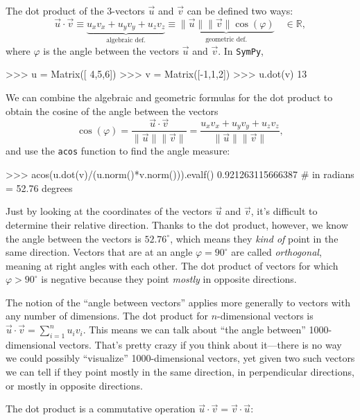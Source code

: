 The dot product of the $3$-vectors $\vec{u}$ and $\vec{v}$ can be defined two ways:
\[
  \vec{u}\cdot\vec{v}
  	\equiv 
	\underbrace{u_xv_x+u_yv_y+u_zv_z}_{\textrm{algebraic def.}} 
	\equiv 
	\underbrace{\|\vec{u}\|\|\vec{v}\|\cos(\varphi)}_{\textrm{geometric def.}} 
	\quad \in \mathbb{R},
\]
where $\varphi$ is the angle between the vectors $\vec{u}$ and $\vec{v}$.
In \texttt{SymPy},

\small
\begin{verbatimtab}
>>> u = Matrix([ 4,5,6])
>>> v = Matrix([-1,1,2])
>>> u.dot(v)
13
\end{verbatimtab}
\normalsize

\noindent
We can combine the algebraic and geometric formulas for the dot product
to obtain the cosine of the angle between the vectors 
\[
    \cos(\varphi)
        = \frac{ \vec{u}\cdot\vec{v} }{  \|\vec{u}\|\|\vec{v}\| }
        = \frac{ u_xv_x+u_yv_y+u_zv_z  }{  \|\vec{u}\|\|\vec{v}\| },
\]
and use the \texttt{acos} function to find the angle measure:

\small
\begin{verbatimtab}
>>> acos(u.dot(v)/(u.norm()*v.norm())).evalf()
0.921263115666387      # in radians  =  52.76 degrees
\end{verbatimtab}
\normalsize

\noindent
Just by looking at the coordinates of the vectors $\vec{u}$ and $\vec{v}$,
it's difficult to determine their relative direction. 
Thanks to the dot product, however,
we know the angle between the vectors is $52.76^\circ$,
which means they \emph{kind of} point in the same direction.
Vectors that are at an angle $\varphi=90^\circ$ are called \emph{orthogonal}, meaning at right angles with each other.
The dot product of vectors for which $\varphi > 90^\circ$ is negative because they point \emph{mostly} in opposite directions.

The notion of the ``angle between vectors'' applies more generally to vectors with any number of dimensions.
The dot product for $n$-dimensional vectors is $\vec{u}\cdot\vec{v}=\sum_{i=1}^n u_iv_i$.
This means we can talk about ``the angle between'' 1000-dimensional vectors.
That's pretty crazy if you think about it---there is no way we could possibly ``visualize'' 1000-dimensional vectors,
yet given two such vectors we can tell if they point mostly in the same direction,
in perpendicular directions, or mostly in opposite directions. 

The dot product is a commutative operation $\vec{u}\cdot\vec{v} = \vec{v}\cdot\vec{u}$:




